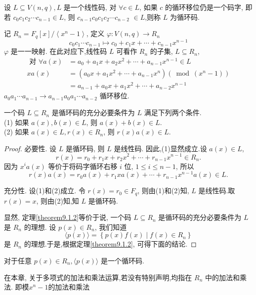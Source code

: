 \begin{definition}[循环码]
 设 $ L \subseteq V(n, q), L $ 是一个线性码, 对 $ \forall c \in L $, 如果 $ c $ 的循环移位仍是一个码字, 即若 $ c_{0} c_{1} c_{2} \cdots c_{n-1} \in L $, 则 $ c_{n-1} c_{0} c_{1} c_{2} \cdots c_{n-2} $ $ \in L $,则称 $ L $ 为循环码.
\end{definition}

记 $ R_{n}=F_{q}[x] /\left\langle x^{n}-1\right\rangle $,
定义 $ \varphi: V(n, q) \rightarrow R_{n} $
$$
c_{0} c_{1} \cdots c_{n-1} \mapsto c_{0}+c_{1} x+\cdots+c_{n-1} x^{n-1}
$$
$ \varphi $ 是一一映射.
在此对应下,线性码 $ L $ 可看作 $ R_{n} $ 的子集, $ L \subseteq R_{n} $,
$$
\begin{aligned}
\text { 对 } \forall a(x) & =a_{0}+a_{1} x+a_{2} x^{2}+\cdots+a_{n-1} x^{n-1} \in L \\
x a(x) & =\left(a_{0} x+a_{1} x^{2}+\cdots+a_{n-1} x^{n}\right)\left(\bmod \left(x^{n}-1\right)\right) \\
& =a_{n-1}+a_{0} x+a_{1} x^{2}+\cdots+a_{n-2} x^{n-1}
\end{aligned}
$$
$ a_{0} a_{1} \cdots a_{n-1} \rightarrow a_{n-1} a_{0} a_{1} \cdots a_{n-2} $ 循环移位.

\begin{theorem}\label{theorem9.1.2}
一个码 $ L \subseteq R_{n} $ 是循环码的充分必要条件为 $ L $ 满足下列两个条件.\\
(1) 如果 $ a(x), b(x) \in L $, 则 $ a(x)+b(x) \in L $.\\
(2) 如果 $ a(x) \in L, r(x) \in R_{n} $, 则 $ r(x) a(x) \in L $.
\end{theorem}
\begin{proof}
 必要性. 设 $ L $ 是循环码, 则 $ L $ 是线性码. 因此,(1)显然成立.设 $ a(x) \in L $,
$$
r(x)=r_{0}+r_{1} x+r_{2} x^{2}+\cdots+r_{n-1} x^{n-1} \in R_{n} .
$$
因为 $ x^{i} a(x) $ 等价于将码字循环右移 $ i $ 位, $ 1 \leq i \leq n-1 $, 所以
$$
r(x) a(x)=r_{0} a(x)+r_{1} x a(x)+\cdots+r_{n-1} x^{n-1} a(x) \in L .
$$

充分性. 设(1)和(2)成立. 令 $ r(x)=r_{0} \in F_{q} $, 则由(1)和(2)知, $ L $ 是线性码.取 $ r(x)=x $, 则由(2)知,知 $ L $ 是循环码.

显然, 定理\ref{theorem9.1.2}等价于说, 一个码 $ L \subseteq R_{n} $ 是循环码的充分必要条件为 $ L $ 是 $ R_{n} $ 的理想.
设 $ p(x) \in R_{n} $, 我们知道
$$
\langle p(x)\rangle=\left\{p(x) f(x) \mid f(x) \in R_{n}\right\}
$$
是 $ R_{n} $ 的理想.于是,根据定理\ref{theorem9.1.2}, 可得下面的结论.

\end{proof}
\begin{theorem}
对于任意 $ p(x) \in R_{n},\langle p(x)\rangle $ 是一个循环码.
\end{theorem}
\begin{remark}
 在本章, 关于多项式的加法和乘法运算,若没有特别声明,均指在 $ R_{n} $ 中的加法和乘法. 即模$x^n-1$的加法和乘法
\end{remark}